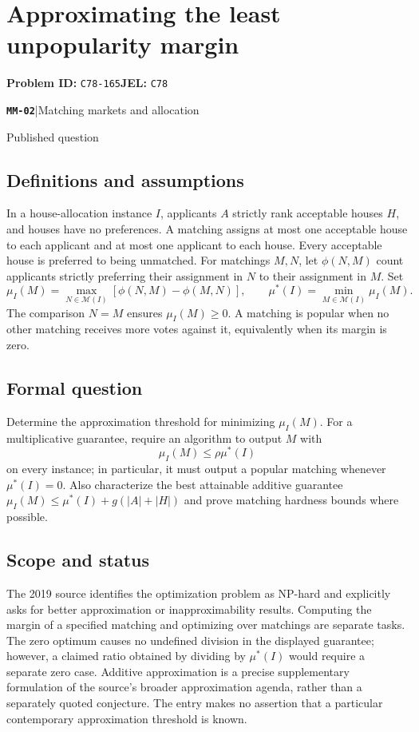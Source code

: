 \documentclass[11pt,a4paper]{article}
\newcommand{\entrymeta}[3]{{\sffamily\small\color{muted}\textbf{\texttt{#1}}\quad|\quad #2\par #3\par}}
\begin{document}
\section*{Approximating the least unpopularity margin}
\textbf{Problem ID:} \texttt{C78-165}\quad \textbf{JEL:} \texttt{C78}\par
\label{problem:OP-0543}
\label{beyond:MM-02}
\entrymeta{MM-02}{Matching markets and allocation}{Published question}
\subsection*{Definitions and assumptions}
In a house-allocation instance $I$, applicants $A$ strictly rank acceptable houses $H$, and houses have no preferences. A matching assigns at most one acceptable house to each applicant and at most one applicant to each house. Every acceptable house is preferred to being unmatched. For matchings $M,N$, let $\phi(N,M)$ count applicants strictly preferring their assignment in $N$ to their assignment in $M$. Set
\[
 \mu_I(M)=\max_{N\in\mathcal M(I)}[\phi(N,M)-\phi(M,N)],
 \qquad \mu^*(I)=\min_{M\in\mathcal M(I)}\mu_I(M).
\]
The comparison $N=M$ ensures $\mu_I(M)\ge0$. A matching is popular when no other matching receives more votes against it, equivalently when its margin is zero.
\subsection*{Formal question}
Determine the approximation threshold for minimizing $\mu_I(M)$. For a multiplicative guarantee, require an algorithm to output $M$ with
\[
 \mu_I(M)\le\rho\mu^*(I)
\]
on every instance; in particular, it must output a popular matching whenever $\mu^*(I)=0$. Also characterize the best attainable additive guarantee $\mu_I(M)\le\mu^*(I)+g(|A|+|H|)$ and prove matching hardness bounds where possible.
\subsection*{Scope and status}
The 2019 source identifies the optimization problem as NP-hard and explicitly asks for better approximation or inapproximability results. Computing the margin of a specified matching and optimizing over matchings are separate tasks. The zero optimum causes no undefined division in the displayed guarantee; however, a claimed ratio obtained by dividing by $\mu^*(I)$ would require a separate zero case. Additive approximation is a precise supplementary formulation of the source's broader approximation agenda, rather than a separately quoted conjecture. The entry makes no assertion that a particular contemporary approximation threshold is known.
\end{document}
